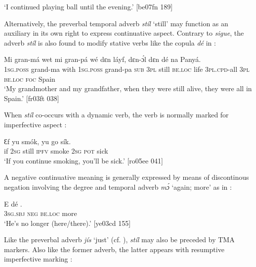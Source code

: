 \glt ‘I continued playing ball until the evening.’ [be07fn 189]
\z

Alternatively, the preverbal temporal adverb \textit{stíl} ‘still’ may function as an auxiliary in its own right to express continuative aspect. Contrary to \textit{sigue}, the adverb \textit{stíl} is also found to modify stative verbs like the copula \textit{dé} in :


\ea%
    \label{ex:key:367}
    \gll Mi    gran-má    wet    mi    gran-pá    wé
dɛn        láyf,    dɛn-ɔ́l    dɛn  dé    na  Panyá.\\
\textsc{1sg.poss}  grand-ma  with    \textsc{1sg.poss}  grand-pa    \textsc{sub}
\textsc{3pl}  still  \textsc{be.loc}   life    \textsc{3pl.cpd-}all  \textsc{3pl}  \textsc{be.loc}  \textsc{foc}  Spain\\

\glt ‘My grandmother and my grandfather, when they were still alive, 
they were all in Spain.’ [fr03ft 038]
\z

When \textit{stíl} co-occurs with a dynamic verb, the verb is normally marked for imperfective aspect :


\ea%
    \label{ex:key:368}
    \gll Ɛf  yu    smók,  yu  go  sík.\\
if  \textsc{2sg}  still  \textsc{ipfv}  smoke  \textsc{2sg}  \textsc{pot}  sick\\

\glt ‘If you continue smoking, you’ll be sick.’ [ro05ee 041]
\z

A negative continuative meaning is generally expressed by means of discontinous negation involving the degree and temporal adverb \textit{mɔ́} ‘again; more’ as in :


\ea%
    \label{ex:key:369}
    \gll E      dé\textstylePichiexamplebold{}   .\\
\textsc{3sg.sbj}  \textsc{neg}  \textsc{be.loc}  more\\

\glt ‘He’s no longer (here/there).’ [ye03cd 155]
\z

Like the preverbal adverb \textit{jís} ‘just’ (cf. ), \textit{stíl} may also be preceded by TMA markers. Also like the former adverb, the latter appears with resumptive imperfective marking : 


